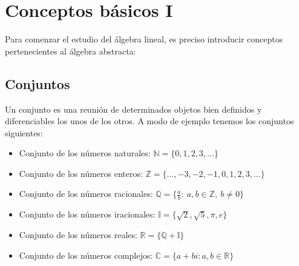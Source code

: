 \documentclass[0_algebra.tex]{subfiles}
\begin{document}

\chapter{Conceptos básicos I}
Para comenzar el estudio del álgebra lineal, es preciso introducir conceptos pertenecientes al álgebra abstracta:
\section{Conjuntos}
Un conjunto es una reunión de determinados objetos bien definidos y diferenciables los unos de los otros. A modo de ejemplo tenemos los conjuntos siguientes:

\begin{itemize}
\item Conjunto de los números naturales: $\mathbb{N}=\lbrace 0,1,2,3,... \rbrace$
\item Conjunto de los números enteros: $\mathbb{Z}=\lbrace ...,-3,-2,-1,0,1,2,3,... \rbrace$
\item Conjunto de los números racionales: $\mathbb{Q}=\lbrace \frac{a}{b}:\ a,b\in \mathbb{Z},\ b\neq 0 \rbrace$
\item Conjunto de los números iracionales: $\mathbb{I}=\lbrace \sqrt{2}, \sqrt{5}, \pi, e  \rbrace$
\item Conjunto de los números reales: $\mathbb{R}=\lbrace \mathbb{Q} +\mathbb{I}\rbrace$
\item Conjunto de los números complejos: $\mathbb{C}=\lbrace a+bi: a,b\in \mathbb{R}\rbrace$
\end{itemize}
\end{document}
